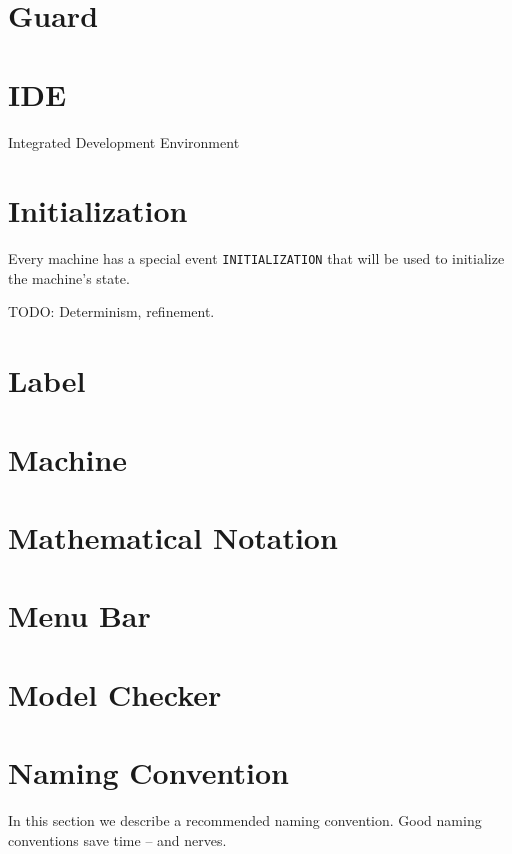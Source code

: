 \section{Guard}
\label{guard}

\section{IDE}
\label{ide}

Integrated Development Environment

\section{Initialization}
\label{initialization}

Every machine has a special event \texttt{INITIALIZATION} that will be used to initialize the machine's state.

TODO: Determinism, refinement.

\section{Label}
\label{label}

\section{Machine}
\label{machine}

\section{Mathematical Notation}
\label{mathematical_notation}

\section{Menu Bar}
\label{menu_bar}

\section{Model Checker}
\label{model_checker}

\section{Naming Convention}
\label{naming_convention}

In this section we describe a recommended naming convention.  Good naming conventions save time -- and nerves.

